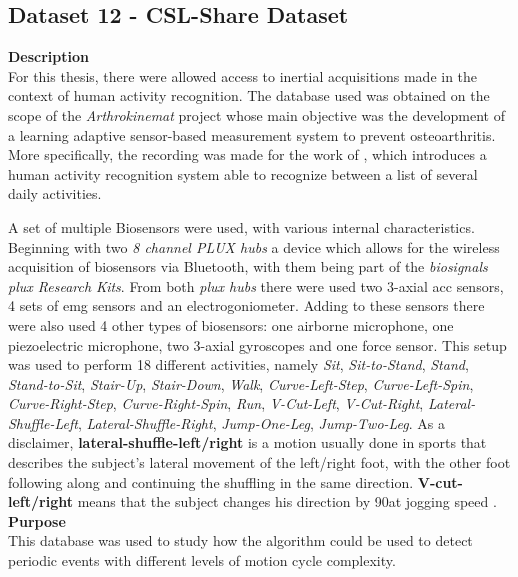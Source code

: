 \subsection{Dataset 12 - CSL-Share Dataset}
\textbf{Description}\\
For this thesis, there were allowed access to inertial acquisitions made in the context of human activity recognition. The database used was obtained on the scope of the \textit{Arthrokinemat} project whose main objective was the development of a learning adaptive sensor-based measurement system to prevent osteoarthritis\cite{arthrokinemat}. More specifically, the recording was made for the work of \cite{Liu2019}, which introduces a human activity recognition system able to recognize between a list of several daily activities.
\par
A set of multiple Biosensors were used, with various internal characteristics. Beginning with two \textit{8 channel PLUX hubs} a device which allows for the wireless acquisition of biosensors via Bluetooth, with them being part of the \textit{biosignals plux Research Kits}. From both \textit{plux hubs} there were used two 3-axial \gls{acc} sensors, 4 sets of \gls{emg} sensors and an electrogoniometer. Adding to these sensors there were also used 4 other types of biosensors: one airborne microphone, one piezoelectric microphone, two 3-axial gyroscopes and one force sensor. This setup was used to perform 18 different activities, namely \textit{Sit}, \textit{Sit-to-Stand}, \textit{Stand}, \textit{Stand-to-Sit}, \textit{Stair-Up}, \textit{Stair-Down}, \textit{Walk}, \textit{Curve-Left-Step}, \textit{Curve-Left-Spin}, \textit{Curve-Right-Step}, \textit{Curve-Right-Spin}, \textit{Run}, \textit{V-Cut-Left}, \textit{V-Cut-Right}, \textit{Lateral-Shuffle-Left}, \textit{Lateral-Shuffle-Right}, \textit{Jump-One-Leg}, \textit{Jump-Two-Leg}. As a disclaimer, \textbf{lateral-shuffle-left/right} is a motion usually done in sports that describes the subject's lateral movement of the left/right foot, with the other foot following along and continuing the shuffling in the same direction. \textbf{V-cut-left/right} means that the subject changes his direction by 90\degree at jogging speed \cite{dataset_hui}.\\
\textbf{Purpose}\\
This database was used to study how the algorithm could be used to detect periodic events with different levels of motion cycle complexity.


